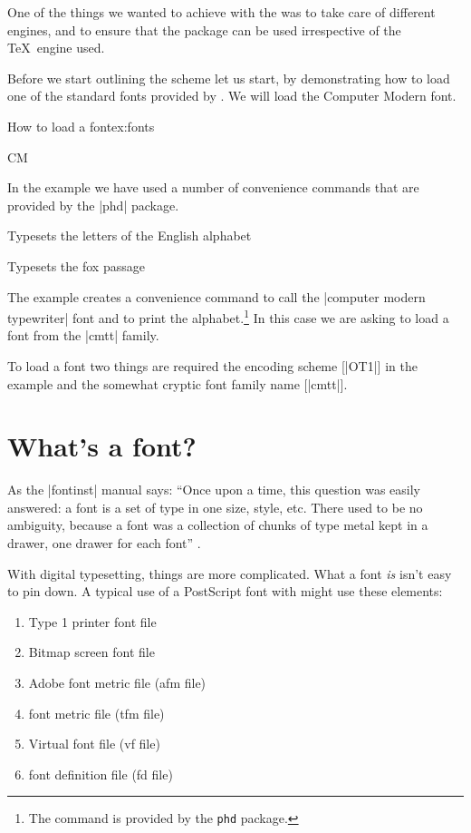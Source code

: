 One of the things we wanted to achieve with the  was  to take care of different \tex engines, and to ensure that the package can be used irrespective of the \TeX\ engine used. 

Before we start outlining the scheme let us start, by demonstrating how to load one of the standard fonts provided by \latexe. We will load the Computer Modern font. 

\begin{texexample}{How to load a font}{ex:fonts}
\newcommand{\fontdemo}[4][OT1]{%
    \textcolor{thefontname}{#2}%
    \fontencoding{#1}\fontfamily{#3}\selectfont#4\\ }

\fontdemo{CM}{cmtt}{\ttfamily\alphabet}

\fox
\end{texexample}

In the example we have used a number of convenience commands that are provided by the |phd| package.

\CMDI{\alphabet} Typesets the letters of the English alphabet

\CMDI{\fox} Typesets the fox passage

The example  creates a convenience command to call the |computer modern typewriter| font and to print the alphabet.\footnote{The command  is provided by the \texttt{phd} package.} In this case we are asking \latex to load a font from the |cmtt| family. 

To load a font two things are required the encoding scheme [|OT1|] in the example and the somewhat cryptic font family name [|cmtt|].

\section{What’s a font?}

As the |fontinst| manual says: ``Once upon a time, this question was easily answered: a font is a set of type
in one size, style, etc. There used to be no ambiguity, because a font was a
collection of chunks of type metal kept in a drawer, one drawer for each font'' \citet{fontinst}.

With digital typesetting, things are more complicated. What a font
\textit{is} isn't easy to pin down. A typical use of a PostScript font with \latex might
use these elements:

\begin{enumerate}
\item Type 1 printer font file
\item Bitmap screen font file
\item Adobe font metric file (afm file)
\item \tex font metric file (tfm file)
\item Virtual font file (vf file)
\item font definition file (fd file)
\end{enumerate}

